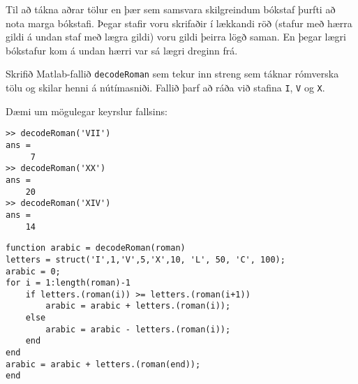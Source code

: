 \documentclass[addpoints]{exam}
\begin{document}
\begin{questions}
Til að tákna aðrar tölur en þær sem samsvara skilgreindum bókstaf þurfti að nota marga bókstafi. Þegar stafir voru skrifaðir í lækkandi röð (stafur með hærra gildi á undan staf með lægra gildi) voru gildi þeirra lögð saman. En þegar lægri bókstafur kom á undan hærri var sá lægri dreginn frá.

Skrifið Matlab-fallið \texttt{decodeRoman} sem tekur inn streng sem táknar rómverska tölu og skilar henni á nútímasniði. Fallið þarf að ráða við stafina \texttt{I}, \texttt{V} og \texttt{X}.

Dæmi um mögulegar keyrslur fallsins:
\begin{verbatim}
>> decodeRoman('VII')
ans =
     7
>> decodeRoman('XX')
ans =
    20
>> decodeRoman('XIV')
ans =
    14
\end{verbatim}

\begin{solution}
\begin{verbatim}
function arabic = decodeRoman(roman)
letters = struct('I',1,'V',5,'X',10, 'L', 50, 'C', 100);
arabic = 0;
for i = 1:length(roman)-1
    if letters.(roman(i)) >= letters.(roman(i+1))
        arabic = arabic + letters.(roman(i));
    else
        arabic = arabic - letters.(roman(i));
    end
end
arabic = arabic + letters.(roman(end));
end
\end{verbatim}

\end{solution}


\newpage
\question 
{}


\end{questions}
\end{document}

